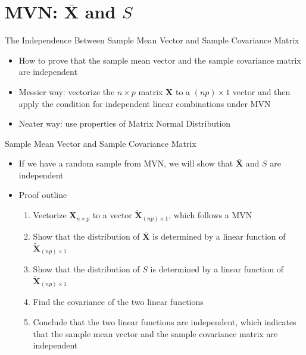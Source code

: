 \documentclass[
  ignorenonframetext,
]{beamer}
\providecommand{\tightlist}{%
  \setlength{\itemsep}{0pt}\setlength{\parskip}{0pt}}
\begin{document}
\hypertarget{mvn-bar-mathbf-x-and-s}{%
\section{\texorpdfstring{MVN: \(\bar {\mathbf X}\) and
\(S\)}{MVN: \textbackslash bar \{\textbackslash mathbf X\} and S}}\label{mvn-bar-mathbf-x-and-s}}

\begin{frame}{The Independence Between Sample Mean Vector and Sample
Covariance Matrix}
\protect\hypertarget{the-independence-between-sample-mean-vector-and-sample-covariance-matrix}{}
\begin{itemize}
\tightlist
\item
  How to prove that the sample mean vector and the sample covariance
  matrix are independent
\item
  Messier way: vectorize the \(n\times p\) matrix \(\mathbf X\) to a
  \((np)\times 1\) vector and then apply the condition for independent
  linear combinations under MVN
\item
  Neater way: use properties of Matrix Normal Distribution
\end{itemize}
\end{frame}

\begin{frame}{Sample Mean Vector and Sample Covariance Matrix}
\protect\hypertarget{sample-mean-vector-and-sample-covariance-matrix}{}
\begin{itemize}
\tightlist
\item
  If we have a random sample from MVN, we will show that
  \(\bar{\mathbf X}\) and \(S\) are independent
\item
  Proof outline

  \begin{enumerate}
  \tightlist
  \item
    Vectorize \(\mathbf X_{n\times p}\) to a vector
    \(\tilde {\mathbf X}_{(np)\times 1}\), which follows a MVN
  \item
    Show that the distribution of \(\bar{\mathbf X}\) is determined by a
    linear function of \(\tilde {\mathbf X}_{(np)\times 1}\)
  \item
    Show that the distribution of \(S\) is determined by a linear
    function of \(\tilde {\mathbf X}_{(np)\times 1}\)
  \item
    Find the covariance of the two linear functions
  \item
    Conclude that the two linear functions are independent, which
    indicates that the sample mean vector and the sample covariance
    matrix are independent
  \end{enumerate}
\end{itemize}
\end{frame}
\end{document}
